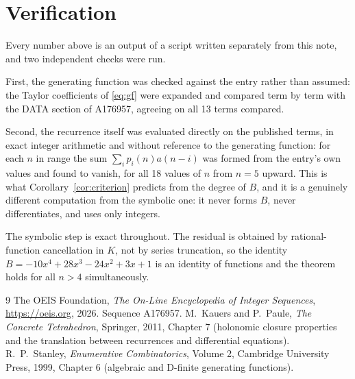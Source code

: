 \documentclass[11pt,a4paper]{article}
\theoremstyle{plain}
\theoremstyle{definition}
\begin{document}
\section{Verification}

Every number above is an output of a script written separately from this note, and two
independent checks were run.

First, the generating function was checked against the entry rather than assumed: the
Taylor coefficients of \eqref{eq:gf} were expanded and compared term by term with the DATA
section of A176957, agreeing on all 13 terms compared.

Second, the recurrence itself was evaluated directly on the published terms, in exact
integer arithmetic and without reference to the generating function: for each $n$ in range
the sum $\sum_{i}p_{i}(n)a(n-i)$ was formed from the entry's own values and found to
vanish, for all 18 values of $n$ from $n=5$ upward. This is what
Corollary~\ref{cor:criterion} predicts from the degree of $B$, and it is a genuinely
different computation from the symbolic one: it never forms $B$, never differentiates, and
uses only integers.

The symbolic step is exact throughout. The residual is obtained by rational-function
cancellation in $K$, not by series truncation, so the identity $B=- 10 x^{4} + 28 x^{3} - 24 x^{2} + 3 x + 1$ is an
identity of functions and the theorem holds for all $n>4$ simultaneously.

\begin{thebibliography}{9}
 The OEIS Foundation, \emph{The On-Line Encyclopedia of Integer Sequences},
\url{https://oeis.org}, 2026. Sequence A176957.
 M.~Kauers and P.~Paule, \emph{The Concrete Tetrahedron}, Springer, 2011,
Chapter 7 (holonomic closure properties and the translation between recurrences and
differential equations).
 R.~P.~Stanley, \emph{Enumerative Combinatorics}, Volume 2, Cambridge
University Press, 1999, Chapter 6 (algebraic and D-finite generating functions).
\end{thebibliography}
\end{document}
